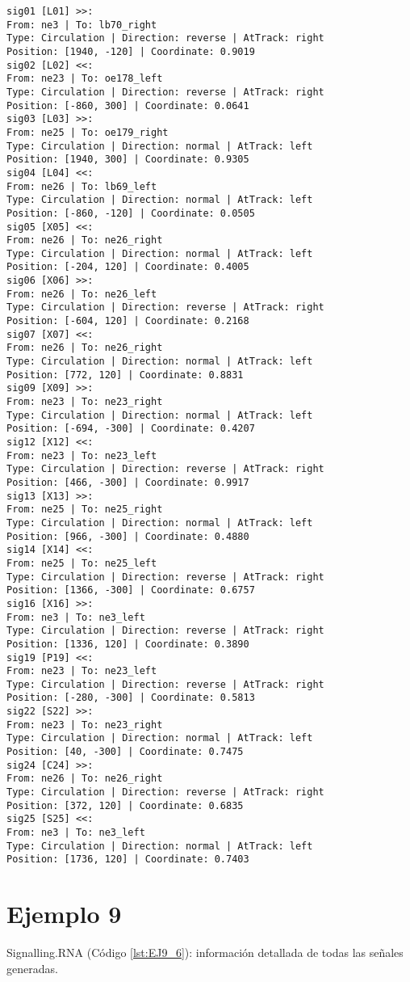 	\begin{lstlisting}[language = {}, caption = Signalling.RNA, label = {lst:EJ8_6}]
sig01 [L01] >>:
From: ne3 | To: lb70_right
Type: Circulation | Direction: reverse | AtTrack: right 
Position: [1940, -120] | Coordinate: 0.9019
sig02 [L02] <<:
From: ne23 | To: oe178_left
Type: Circulation | Direction: reverse | AtTrack: right 
Position: [-860, 300] | Coordinate: 0.0641
sig03 [L03] >>:
From: ne25 | To: oe179_right
Type: Circulation | Direction: normal | AtTrack: left 
Position: [1940, 300] | Coordinate: 0.9305
sig04 [L04] <<:
From: ne26 | To: lb69_left
Type: Circulation | Direction: normal | AtTrack: left 
Position: [-860, -120] | Coordinate: 0.0505
sig05 [X05] <<:
From: ne26 | To: ne26_right
Type: Circulation | Direction: normal | AtTrack: left 
Position: [-204, 120] | Coordinate: 0.4005
sig06 [X06] >>:
From: ne26 | To: ne26_left
Type: Circulation | Direction: reverse | AtTrack: right 
Position: [-604, 120] | Coordinate: 0.2168
sig07 [X07] <<:
From: ne26 | To: ne26_right
Type: Circulation | Direction: normal | AtTrack: left 
Position: [772, 120] | Coordinate: 0.8831
sig09 [X09] >>:
From: ne23 | To: ne23_right
Type: Circulation | Direction: normal | AtTrack: left 
Position: [-694, -300] | Coordinate: 0.4207
sig12 [X12] <<:
From: ne23 | To: ne23_left
Type: Circulation | Direction: reverse | AtTrack: right 
Position: [466, -300] | Coordinate: 0.9917
sig13 [X13] >>:
From: ne25 | To: ne25_right
Type: Circulation | Direction: normal | AtTrack: left 
Position: [966, -300] | Coordinate: 0.4880
sig14 [X14] <<:
From: ne25 | To: ne25_left
Type: Circulation | Direction: reverse | AtTrack: right 
Position: [1366, -300] | Coordinate: 0.6757
sig16 [X16] >>:
From: ne3 | To: ne3_left
Type: Circulation | Direction: reverse | AtTrack: right 
Position: [1336, 120] | Coordinate: 0.3890
sig19 [P19] <<:
From: ne23 | To: ne23_left
Type: Circulation | Direction: reverse | AtTrack: right 
Position: [-280, -300] | Coordinate: 0.5813
sig22 [S22] >>:
From: ne23 | To: ne23_right
Type: Circulation | Direction: normal | AtTrack: left 
Position: [40, -300] | Coordinate: 0.7475
sig24 [C24] >>:
From: ne26 | To: ne26_right
Type: Circulation | Direction: reverse | AtTrack: right 
Position: [372, 120] | Coordinate: 0.6835
sig25 [S25] <<:
From: ne3 | To: ne3_left
Type: Circulation | Direction: normal | AtTrack: left 
Position: [1736, 120] | Coordinate: 0.7403
	\end{lstlisting}	
	\section{Ejemplo 9}
	Signalling.RNA (Código \ref{lst:EJ9_6}): información detallada de todas las señales generadas.
	
